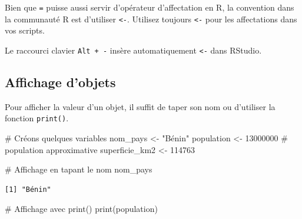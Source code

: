 \documentclass[
  french,
  11pt,
  a4paper,
]{article}
\newenvironment{Shaded}{}{}
\newcommand{\CommentTok}[1]{\textcolor[rgb]{0.42,0.45,0.49}{#1}}
\newcommand{\DecValTok}[1]{\textcolor[rgb]{0.00,0.36,0.77}{#1}}
\newcommand{\FunctionTok}[1]{\textcolor[rgb]{0.44,0.26,0.76}{#1}}
\newcommand{\NormalTok}[1]{\textcolor[rgb]{0.14,0.16,0.18}{#1}}
\newcommand{\OtherTok}[1]{\textcolor[rgb]{0.44,0.26,0.76}{#1}}
\newcommand{\StringTok}[1]{\textcolor[rgb]{0.01,0.18,0.38}{#1}}
\begin{document}
\begin{tcolorbox}[enhanced jigsaw, arc=.35mm, bottomrule=.15mm, bottomtitle=1mm, breakable, colback=white, colbacktitle=quarto-callout-note-color!10!white, colframe=quarto-callout-note-color-frame, coltitle=black, left=2mm, leftrule=.75mm, opacityback=0, opacitybacktitle=0.6, rightrule=.15mm, title=\textcolor{quarto-callout-note-color}{\faInfo}\hspace{0.5em}{Note sur \texttt{=} vs \texttt{\textless{}-}}, titlerule=0mm, toprule=.15mm, toptitle=1mm]

Bien que \texttt{=} puisse aussi servir d'opérateur d'affectation en R,
la convention dans la communauté R est d'utiliser \texttt{\textless{}-}.
Utilisez toujours \texttt{\textless{}-} pour les affectations dans vos
scripts.

Le raccourci clavier \texttt{Alt\ +\ -} insère automatiquement
\texttt{\textless{}-} dans RStudio.

\end{tcolorbox}

\subsection{Affichage d'objets}\label{affichage-dobjets}

Pour afficher la valeur d'un objet, il suffit de taper son nom ou
d'utiliser la fonction \texttt{print()}.

\begin{Shaded}
\begin{Highlighting}[]
\CommentTok{\# Créons quelques variables}
\NormalTok{nom\_pays }\OtherTok{\textless{}{-}} \StringTok{"Bénin"}
\NormalTok{population }\OtherTok{\textless{}{-}} \DecValTok{13000000}  \CommentTok{\# population approximative}
\NormalTok{superficie\_km2 }\OtherTok{\textless{}{-}} \DecValTok{114763}

\CommentTok{\# Affichage en tapant le nom}
\NormalTok{nom\_pays}
\end{Highlighting}
\end{Shaded}

\begin{verbatim}
[1] "Bénin"
\end{verbatim}

\begin{Shaded}
\begin{Highlighting}[]
\CommentTok{\# Affichage avec print()}
\FunctionTok{print}\NormalTok{(population)}
\end{Highlighting}
\end{Shaded}
\end{document}
